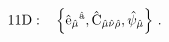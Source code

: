 \begin{equation}
\rm{11D:~~~}
\left\{\hat{e}_{\hat{\mu}}{}^{\hat{a}},
\hat{C}_{\hat{\mu}\hat{\nu}\hat{\rho}},
\hat{\psi}_{\hat{\mu}}
\right\}\, .
\end{equation}

